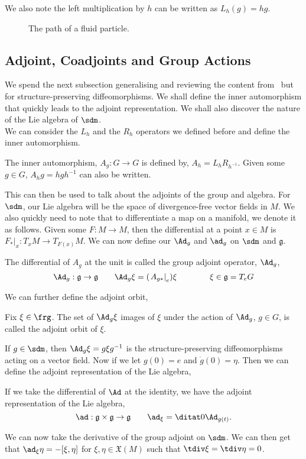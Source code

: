 \noindent
We also note the left multiplication by $h$ can be written as $L_h(g) = hg$.

\begin{figure}[!ht]
\centering
\resizebox{0.6\textwidth}{!}{}
\caption{The path of a fluid particle.}
\label{fig:diffeos}
\end{figure}

\subsection{Adjoint, Coadjoints and Group Actions}
We spend the next subsection generalising and reviewing the content from~\cite{arthur} but for structure-preserving diffeomorphisms. We shall define the inner automorphism that quickly leads to the adjoint representation. We shall also discover the nature of the Lie algebra of $\sdm$.\\

\noindent
We can consider the $L_h$ and the $R_h$ operators we defined before and define the inner automorphism.
\begin{ndefi}
  The inner automorphism, $A_g : G \to G$ is defined by, $A_h = L_hR_{h^{-1}}$. Given some $g \in G$, $A_hg = hgh^{-1}$ can also be written.
\end{ndefi}
\noindent
This can then be used to talk about the adjoints of the group and algebra. For $\sdm$, our Lie algebra will be the space of divergence-free vector fields in $M$. We also quickly need to note that to differentiate a map on a manifold, we denote it as follows. Given some $F : M \to M$, then the differential at a point $x \in M$ is $\left.F_*\right|_x : T_xM \to T_{F(x)}M$. We can now define our $\Ad_g$ and $\ad_g$ on $\sdm$ and $\mathfrak{g}$.
\begin{ndefi}
  The differential of $A_g$ at the unit is called the group adjoint operator, $\Ad_g$,
  $$ \Ad_g : \mathfrak{g} \to \mathfrak{g} \qquad \Ad_g \xi = (\left. A_{g*} \right|_e)\xi \qquad \qquad \xi \in \mathfrak{g} = T_eG$$
\end{ndefi}
\noindent
We can further define the adjoint orbit,
\begin{ndefi}
  Fix $\xi \in \frg$. The set of $\Ad_g\xi$ images of $\xi$ under the action of $\Ad_g$, $g \in G$, is called the adjoint orbit of $\xi$.
\end{ndefi}
\noindent
If $g \in \sdm$, then $\Ad_g\xi = g\xi g^{-1}$ is the structure-preserving diffeomorphisms acting on a vector field. Now if we let $g(0) = e$ and $\dot g(0) = \eta$. Then we can define the adjoint representation of the Lie algebra,
\begin{ndefi}
  If we take the differential of $\Ad$ at the identity, we have the adjoint representation of the Lie algebra,
  $$ \ad : \mathfrak{g} \times \mathfrak{g} \to \mathfrak{g} \qquad \ad_\xi = \ditat 0 \Ad_{g(t)}. $$
\end{ndefi}
\noindent
We can now take the derivative of the group adjoint on $\sdm$. We can then get that $\ad_\xi\eta = -[\xi, \eta]$ for $\xi, \eta \in \mathfrak{X}(M)$ such that $\tdiv \xi = \tdiv \eta = 0$. \\

